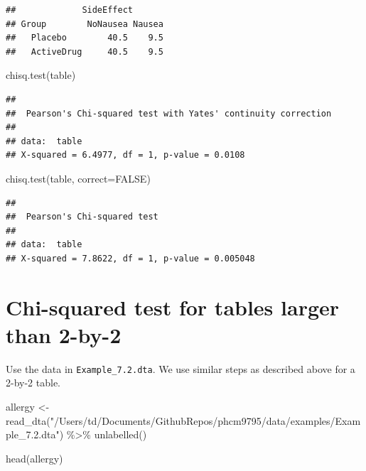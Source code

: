 \documentclass[
]{memoir}
\newenvironment{Shaded}{\begin{snugshade}}{\end{snugshade}}
\newcommand{\AttributeTok}[1]{\textcolor[rgb]{0.77,0.63,0.00}{#1}}
\newcommand{\ConstantTok}[1]{\textcolor[rgb]{0.00,0.00,0.00}{#1}}
\newcommand{\FunctionTok}[1]{\textcolor[rgb]{0.00,0.00,0.00}{#1}}
\newcommand{\NormalTok}[1]{#1}
\newcommand{\OtherTok}[1]{\textcolor[rgb]{0.56,0.35,0.01}{#1}}
\newcommand{\SpecialCharTok}[1]{\textcolor[rgb]{0.00,0.00,0.00}{#1}}
\newcommand{\StringTok}[1]{\textcolor[rgb]{0.31,0.60,0.02}{#1}}
\begin{document}
\begin{verbatim}
##             SideEffect
## Group        NoNausea Nausea
##   Placebo        40.5    9.5
##   ActiveDrug     40.5    9.5
\end{verbatim}

\begin{Shaded}
\begin{Highlighting}[]
\FunctionTok{chisq.test}\NormalTok{(table)}
\end{Highlighting}
\end{Shaded}

\begin{verbatim}
## 
##  Pearson's Chi-squared test with Yates' continuity correction
## 
## data:  table
## X-squared = 6.4977, df = 1, p-value = 0.0108
\end{verbatim}

\begin{Shaded}
\begin{Highlighting}[]
\FunctionTok{chisq.test}\NormalTok{(table, }\AttributeTok{correct=}\ConstantTok{FALSE}\NormalTok{)}
\end{Highlighting}
\end{Shaded}

\begin{verbatim}
## 
##  Pearson's Chi-squared test
## 
## data:  table
## X-squared = 7.8622, df = 1, p-value = 0.005048
\end{verbatim}

\hypertarget{chi-squared-test-for-tables-larger-than-2-by-2}{%
\section{Chi-squared test for tables larger than 2-by-2}\label{chi-squared-test-for-tables-larger-than-2-by-2}}

Use the data in \texttt{Example\_7.2.dta}. We use similar steps as described above for a 2-by-2 table.

\begin{Shaded}
\begin{Highlighting}[]
\NormalTok{allergy }\OtherTok{\textless{}{-}} \FunctionTok{read\_dta}\NormalTok{(}\StringTok{"/Users/td/Documents/GithubRepos/phcm9795/data/examples/Example\_7.2.dta"}\NormalTok{) }\SpecialCharTok{\%\textgreater{}\%} 
  \FunctionTok{unlabelled}\NormalTok{()}

\FunctionTok{head}\NormalTok{(allergy)}
\end{Highlighting}
\end{Shaded}
\end{document}
